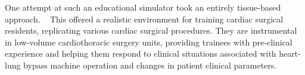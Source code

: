 One attempt at such an educational simulator took an entirely tissue-based approach. ~ This offered a realistic environment for training cardiac surgical residents, replicating various cardiac surgical procedures. They are instrumental in low-volume cardiothoracic surgery units, providing trainees with pre-clinical experience and helping them respond to clinical situations associated with heart-lung bypass machine operation and changes in patient clinical parameters.\\
